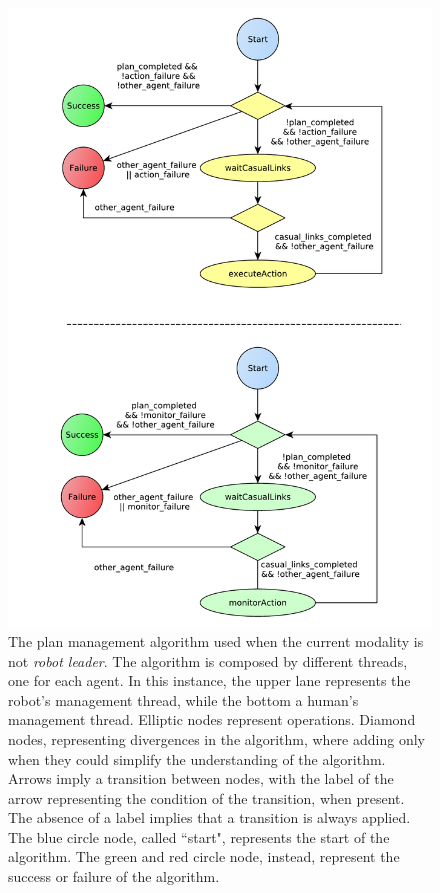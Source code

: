 \begin{figure}[ht!]
 \centering
 \includegraphics[scale=0.6]{img/plan_management/manage_plan_not_leader.pdf}
 \caption[Plan Management when the robot is not leader]{The plan management algorithm used when the current modality is not \textit{robot leader}. The algorithm is composed by different threads, one for each agent. In this instance, the upper lane represents the robot's management thread, while the bottom a human's management thread. Elliptic nodes represent operations. Diamond nodes, representing divergences in the algorithm, where adding only when they could simplify the understanding of the algorithm. Arrows imply a transition between nodes, with the label of the arrow representing the condition of the transition, when present. The absence of a label implies that a transition is always applied. The blue circle node, called ``start", represents the start of the algorithm. The green and red circle node, instead, represent the success or failure of the algorithm.}
 \label{fig:plan_management-manage_plan_not_leader}
 \end{figure}

